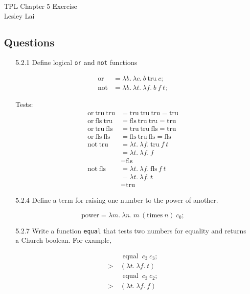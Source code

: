 \documentclass[12pt]{article}
\newcommand{\mt}[1]{\ensuremath{\text{#1}}}
\newcommand{\tru}{\mt{tru}}
\newcommand{\fls}{\mt{fls}}
\newcommand{\abstr}[1]{\lambda #1.\ }
\begin{document}
TPL \hfill Chapter 5 Exercise\\
Lesley Lai

\hrulefill

\subsection*{Questions}

\begin{enumerate}

\item[5.2.1] Define logical \texttt{or} and \texttt{not} functions

\begin{align*}
\mt{or} &= \abstr{b} \abstr{c} b \ \tru \ c; \\
\mt{not} &= \abstr{b} \abstr{t} \abstr{f} b \ f \ t ;
\end{align*}

Tests:
\begin{align*}
\mt{or} \ \tru \ \tru &= \tru \ \tru \ \tru = \tru \\
\mt{or} \ \fls \ \tru &= \fls \ \tru \ \tru = \tru \\
\mt{or} \ \tru \ \fls &= \tru \ \tru \ \fls = \tru \\
\mt{or} \ \fls \ \fls &= \fls \ \tru \ \fls = \fls \\
\mt{not} \ \tru &= \abstr{t}\abstr{f} \tru \ f \ t \\
&= \abstr{t} \abstr{f} f \\ &= \fls \\
\mt{not} \ \fls &= \abstr{t}\abstr{f} \fls \ f \ t \\
&= \abstr{t} \abstr{f} t \\ &= \tru
\end{align*}

\newpage

\item[5.2.4] Define a term for raising one number to the
power of another.

$$
\mt{power} = \abstr{m}\abstr{n} m\ (\mt{times}\ n)\ c_0;
$$

\item[5.2.7] Write a function \texttt{equal} that tests two numbers for equality and returns a Church boolean. For example,

\begin{align*}
& \mt{ equal } \ c_3 \ c_3 ; \\
>\ & (\abstr{t} \abstr{f} t) \\
& \mt { equal } \ c_3 \ c_2 ; \\
>\ & (\abstr{t} \abstr{f} f)
\end{align*}


\end{enumerate}
\end{document}
